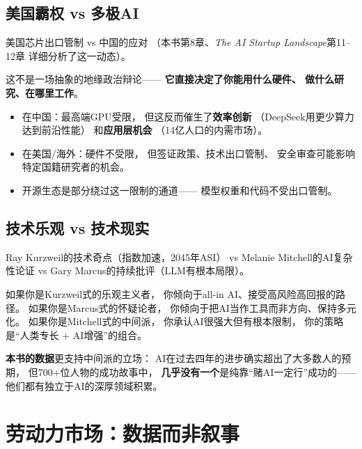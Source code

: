 \subsection{美国霸权 vs 多极AI}

美国芯片出口管制 vs 中国的应对
（本书第8章、\textit{The AI Startup Landscape}第11--12章
详细分析了这一动态）。

这不是一场抽象的地缘政治辩论——
\textbf{它直接决定了你能用什么硬件、
做什么研究、在哪里工作}。

\begin{itemize}
  \item 在中国：最高端GPU受限，
    但这反而催生了\textbf{效率创新}
    （DeepSeek用更少算力达到前沿性能）
    和\textbf{应用层机会}
    （14亿人口的内需市场）。
  \item 在美国/海外：硬件不受限，
    但签证政策、技术出口管制、
    安全审查可能影响特定国籍研究者的机会。
  \item 开源生态是部分绕过这一限制的通道——
    模型权重和代码不受出口管制。
\end{itemize}

\subsection{技术乐观 vs 技术现实}

Ray Kurzweil的技术奇点（指数加速，2045年ASI）
vs Melanie Mitchell的AI复杂性论证
vs Gary Marcus的持续批评（LLM有根本局限）。

\begin{whybox}[你在这个光谱上的位置影响你的风险偏好]
如果你是Kurzweil式的乐观主义者，
你倾向于all-in AI、接受高风险高回报的路径。
如果你是Marcus式的怀疑论者，
你倾向于把AI当作工具而非方向、保持多元化。
如果你是Mitchell式的中间派，
你承认AI很强大但有根本限制，
你的策略是``人类专长 + AI增强''的组合。

\textbf{本书的数据}更支持中间派的立场：
AI在过去四年的进步确实超出了大多数人的预期，
但700+位人物的成功故事中，
\textbf{几乎没有一个}是纯靠``赌AI一定行''成功的——
他们都有独立于AI的深厚领域积累。
\end{whybox}


\section{劳动力市场：数据而非叙事}
\label{sec:fg-labor-market}

